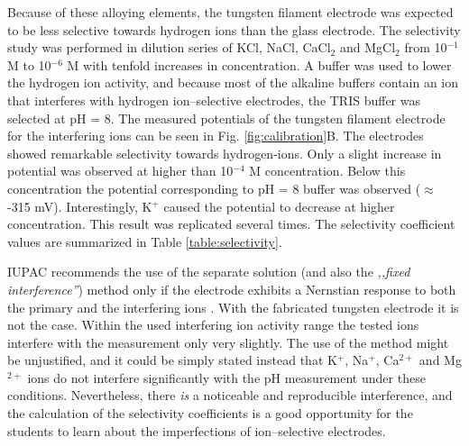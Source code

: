 \documentclass[manuscript=article, journal=jceda8]{achemso}
\begin{document}
Because of these alloying elements, the tungsten filament electrode was expected to be less selective towards hydrogen ions than the glass electrode. The selectivity study was performed in dilution series of KCl, NaCl, CaCl$_2$ and MgCl$_2$ from 10$^{-1}$ M to 10$^{-6}$ M with tenfold increases in concentration. A buffer was used to lower the hydrogen ion activity, and because most of the alkaline buffers contain an ion that interferes with hydrogen ion--selective electrodes, the TRIS buffer was selected at pH = 8.
The measured potentials of the tungsten filament electrode for the interfering ions can be seen in Fig. \ref{fig:calibration}B. The electrodes showed remarkable selectivity towards hydrogen-ions. Only a slight increase in potential was observed at higher than 10$^{-4}$ M concentration. Below this concentration the potential corresponding to pH = 8 buffer was observed ($\approx$ -315 mV). Interestingly, K$^+$ caused the potential to decrease at higher concentration. This result was replicated several times. The selectivity coefficient values are summarized in Table \ref{table:selectivity}.

IUPAC recommends the use of the separate solution (and also the \emph{,,fixed interference''}) method only if the electrode exhibits a Nernstian response to both the primary and the interfering ions \cite{buck1994recommendations}. With the fabricated tungsten electrode it is not the case. Within the used interfering ion activity range the tested ions interfere with the measurement only very slightly. The use of the method might be unjustified, and it could be simply stated instead that K$^+$, Na$^+$, Ca$^{2+}$ and Mg$^{2+}$ ions do not interfere significantly with the pH measurement under these conditions. Nevertheless, there \emph{is} a noticeable and reproducible interference, and the calculation of the selectivity coefficients is a good opportunity for the students to learn about the imperfections of ion--selective electrodes.
\end{document}
